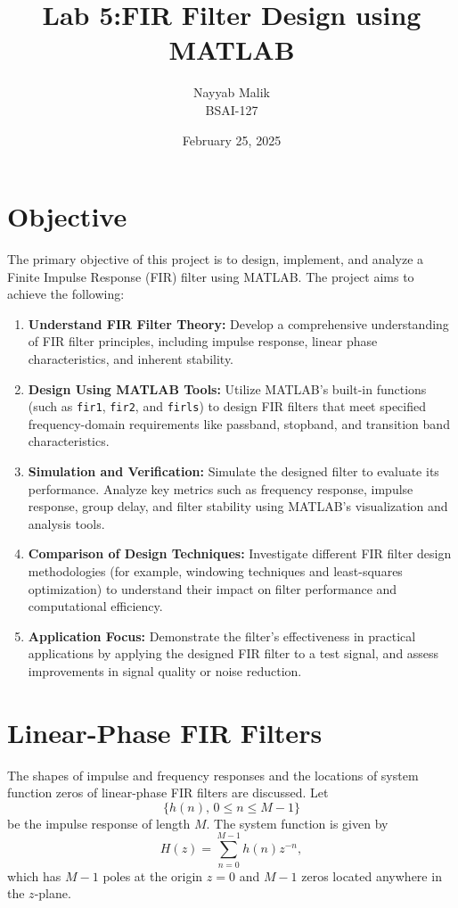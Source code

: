 \documentclass[a4paper,12pt]{article}
\title{\textbf{ Lab 5:FIR Filter Design using MATLAB
}}
\author{Nayyab Malik\\BSAI-127}
\date{February 25, 2025}
\begin{document}
\maketitle
\tableofcontents
\newpage
\section*{Objective}
The primary objective of this project is to design, implement, and analyze a Finite Impulse Response (FIR) filter using MATLAB. The project aims to achieve the following:

\begin{enumerate}[label=\arabic*.]
    \item \textbf{Understand FIR Filter Theory:} Develop a comprehensive understanding of FIR filter principles, including impulse response, linear phase characteristics, and inherent stability.
    \item \textbf{Design Using MATLAB Tools:} Utilize MATLAB's built-in functions (such as \texttt{fir1}, \texttt{fir2}, and \texttt{firls}) to design FIR filters that meet specified frequency-domain requirements like passband, stopband, and transition band characteristics.
    \item \textbf{Simulation and Verification:} Simulate the designed filter to evaluate its performance. Analyze key metrics such as frequency response, impulse response, group delay, and filter stability using MATLAB's visualization and analysis tools.
    \item \textbf{Comparison of Design Techniques:} Investigate different FIR filter design methodologies (for example, windowing techniques and least-squares optimization) to understand their impact on filter performance and computational efficiency.
    \item \textbf{Application Focus:} Demonstrate the filter's effectiveness in practical applications by applying the designed FIR filter to a test signal, and assess improvements in signal quality or noise reduction.
\end{enumerate}
\section*{Linear-Phase FIR Filters}

The shapes of impulse and frequency responses and the locations of system function zeros of linear-phase FIR filters are discussed. Let 
\[
\{h(n),\, 0 \le n \le M-1\}
\]
be the impulse response of length \(M\). The system function is given by
\[
H(z) = \sum_{n=0}^{M-1} h(n)z^{-n},
\]
which has \(M-1\) poles at the origin \(z = 0\) and \(M-1\) zeros located anywhere in the \(z\)-plane.
\end{document}
